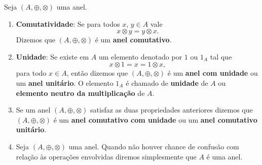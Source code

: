 \begin{observacoes}
	Seja $(A, \oplus, \otimes)$ uma anel.
	\begin{enumerate}[label={\arabic*})]
		\item \textbf{Comutatividade}: Se para todos $x$, $y \in A$ vale
		\[
			x \otimes y = y \otimes x.
		\]
		Dizemos que $(A, \oplus, \otimes)$ {\'e} um \textbf{anel comutativo}.

		\item \textbf{Unidade}: Se existe em $A$ um elemento denotado por $1$ ou $1_{A}$ tal que
		\[
			x \otimes 1 = x = 1 \otimes x,
		\]
		para todo $x \in A$, ent{\~a}o dizemos que $(A, \oplus, \otimes)$ \'e um \textbf{anel com unidade} ou um \textbf{anel unit{\'a}rio}. O elemento $1_A$ {\'e} chamado de \textbf{unidade} de $A$ ou \textbf{elemento neutro da multiplica\c{c}\~ao} de $A$.

		\item Se um anel $(A, \oplus, \otimes)$ satisfaz as duas propriedades anteriores dizemos que $(A, \oplus, \otimes)$ \'e um \textbf{anel comutativo com unidade} ou um \textbf{anel comutativo unit\'ario}.

		\item Seja $(A, \oplus, \otimes)$ uma anel. Quando n\~ao houver chance de confus\~ao com rela\c{c}\~ao \`as opera\c{c}\~oes envolvidas diremos simplesmente que $A$ \'e uma anel.
	\end{enumerate}
\end{observacoes}

